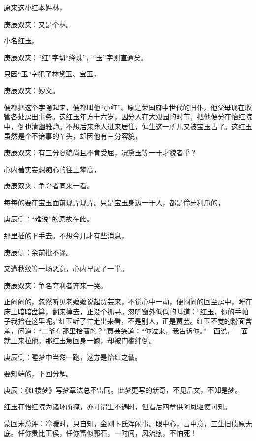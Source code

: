 \begin{parag}
    原来这小红本姓林，\begin{note}庚辰双夹：又是个林。\end{note}小名红玉，\begin{note}庚辰双夹：“红”字切“绛珠”，“玉”字则直通矣。\end{note}只因“玉”字犯了林黛玉、宝玉，\begin{note}庚辰双夹：妙文。\end{note}便都把这个字隐起来，便都叫他“小红”。原是荣国府中世代的旧仆，他父母现在收管各处房田事务。这红玉年方十六岁，因分人在大观园的时节，把他便分在怡红院中，倒也清幽雅静。不想后来命人进来居住，偏生这一所儿又被宝玉占了。这红玉虽然是个不谙事的丫头，却因他有三分容貌，\begin{note}庚辰双夹：有三分容貌尚且不肯受屈，况黛玉等一干才貌者乎？\end{note}心内著实妄想痴心的往上攀高，\begin{note}庚辰双夹：争夺者同来一看。\end{note}每每的要在宝玉面前现弄现弄。只是宝玉身边一干人，都是伶牙利爪的，\begin{note}庚辰侧：“难说”的原故在此。\end{note}那里插的下手去。不想今儿才有些消息，\begin{note}庚辰侧：余前批不谬。\end{note}又遭秋纹等一场恶意，心内早灰了一半。\begin{note}庚辰双夹：争名夺利者齐来一哭。\end{note}正闷闷的，忽然听见老嬷嬷说起贾芸来，不觉心中一动，便闷闷的回至房中，睡在床上暗暗盘算，翻来掉去，正没个抓寻。忽听窗外低低的叫道：“红玉，你的手帕子我拾在这里呢。”红玉听了忙走出来看，不是别人，正是贾芸。红玉不觉的粉面含羞，问道：“二爷在那里拾著的？”贾芸笑道：“你过来，我告诉你。”一面说，一面就上来拉他。那红玉急回身一跑，却被门槛绊倒。\begin{note}庚辰侧：睡梦中当然一跑，这方是怡红之鬟。\end{note}要知端的，下回分解。
\end{parag}


\begin{parag}
    \begin{note}庚辰：《红楼梦》写梦章法总不雷同。此梦更写的新奇，不见后文，不知是梦。\end{note}
\end{parag}


\begin{parag}
    \begin{note}红玉在怡红院为诸环所掩，亦可谓生不遇时，但看后四章供阿凤驱使可知。\end{note}
\end{parag}


\begin{parag}
    \begin{note}蒙回末总评：冷暖时，只自知，金刚卜氏浑闲事。眼中心，言中意，三生旧债原无底。任你贵比王侯，任你富似郭石，一时间，风流愿，不怕死！\end{note}
\end{parag}

